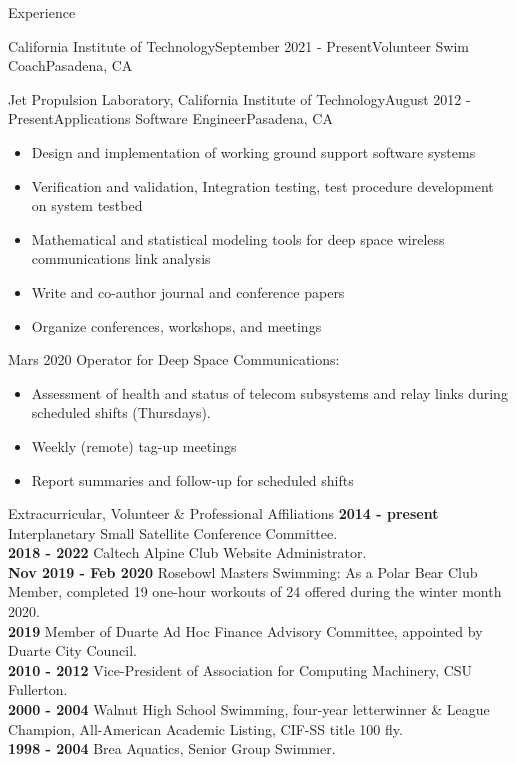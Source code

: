 \documentclass{resume} %
\begin{document}
\begin{rSection}{Experience}
\begin{rSubsection}{California Institute of Technology}{September 2021 - Present}{Volunteer Swim Coach}{Pasadena, CA}
\begin{rSubsection}{Jet Propulsion Laboratory, California Institute of Technology}{August 2012 - Present}{Applications Software Engineer}{Pasadena, CA}
  \begin{itemize}

     \item Design and implementation of working ground support software systems   
     \item Verification and validation, Integration testing, test procedure development on system testbed
     \item Mathematical and statistical modeling tools for deep space wireless communications link analysis
     \item Write and co-author journal and conference papers 
     \item Organize conferences, workshops, and meetings

  \end{itemize}

\item Mars 2020 Operator for Deep Space Communications:
  \begin{itemize}

     \item Assessment of health and status of telecom subsystems and relay links during scheduled shifts (Thursdays).
     \item Weekly (remote) tag-up meetings
     \item Report summaries and follow-up for scheduled shifts
  \end{itemize}


\end{rSubsection}




\begin{rSection}{ Extracurricular, Volunteer \& Professional Affiliations}
{\bf 2014 - present} Interplanetary Small Satellite Conference Committee.\\
{\bf 2018 - 2022} Caltech Alpine Club Website Administrator.\\
{\bf Nov 2019 - Feb 2020} Rosebowl Masters Swimming: As a Polar Bear Club Member, completed 19 one-hour workouts of 24 offered during the winter month 2020. \\
{\bf 2019} Member of Duarte Ad Hoc Finance Advisory Committee, appointed by Duarte City Council. \\
{\bf 2010 - 2012} Vice-President of Association for Computing Machinery, CSU Fullerton.\\
{\bf 2000 - 2004} Walnut High School Swimming, four-year letterwinner \& League Champion, All-American Academic Listing, CIF-SS title 100 fly. \\
{\bf 1998 - 2004} Brea Aquatics, Senior Group Swimmer.
 


\end{rSection}
\end{rSubsection}
\end{rSection}
\end{document}

